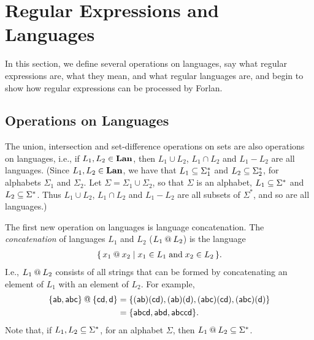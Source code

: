 \section{Regular Expressions and Languages}
\label{RegularExpressionsAndLanguages}

In this section, we define several operations on languages, say what
regular expressions are, what they mean, and what regular languages
are, and begin to show how regular expressions can be processed by Forlan.

\subsection{Operations on Languages}

%
%
%
The union, intersection and set-difference operations on sets are also
operations on languages, i.e., if $L_1,L_2\in\mathbf{Lan}$, then $L_1\cup
L_2$, $L_1\cap L_2$ and $L_1-L_2$ are all languages.
(Since $L_1,L_2\in\mathbf{Lan}$, we have that $L_1\subseteq\Sigma_1^*$
and $L_2\subseteq\Sigma_2^*$, for alphabets $\Sigma_1$ and $\Sigma_2$.
Let $\Sigma=\Sigma_1\cup\Sigma_2$, so that $\Sigma$ is an alphabet,
$L_1\subseteq\Sigma^*$ and $L_2\subseteq\Sigma^*$.
Thus $L_1\cup L_2$, $L_1\cap L_2$ and $L_1-L_2$ are all subsets
of $\Sigma^*$, and so are all languages.)

%
%
The first new operation on languages is language concatenation.
The \emph{concatenation} of languages $L_1$ and $L_2$ ($L_1\mathbin{@}
L_2$)
%
%
is the language
\begin{gather*}
\{ \, x_1\mathbin{@} x_2 \mid x_1\in L_1\;\allowbreak\mbox{and}\allowbreak\;x_2\in L_2 \, \} .
\end{gather*}
I.e., $L_1\mathbin{@} L_2$ consists of all strings that can be formed by
concatenating an element of $L_1$ with an element of $L_2$.
For example,
\begin{align*}
\mathsf{\{ab,abc\}\mathbin{@}\{cd,d\}} &=
\mathsf{\{(ab)(cd), (ab)(d), (abc)(cd), (abc)(d)\}} \\
&= \mathsf{\{abcd, abd, abccd\}}.
\end{align*}
Note that, if $L_1,L_2\subseteq\Sigma^*$, for an alphabet $\Sigma$,
then $L_1\mathbin{@} L_2\subseteq\Sigma^*$.


